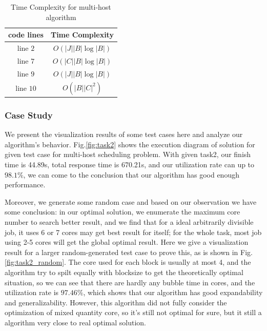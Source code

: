 \documentclass{llncs}
\begin{document}
\begin{table}[t]
\caption{Time Complexity for multi-host algorithm}
\begin{center}
\begin{tabular}{c|c}
\toprule
\textbf{code lines} &\textbf{Time Complexity}  \\
\midrule
line $2$ & $O(|J| |B|\log |B|)$  \\
line $7$ & $O(|C| |B| \log |B| )$  \\
line $9$ & $O(|J| |B| \log |B|)$  \\
line $10$ & $O(|B| |C|^2)$\\
\bottomrule
\end{tabular}
\label{tab-multihost-complexity}
\end{center}
\end{table}


\subsubsection*{Case Study}

We present the visualization results of some test cases here and analyze our algorithm's behavior. Fig.\ref{fig:task2} shows the execution diagram of solution for given test case for multi-host scheduling problem. With given task2, our finish time is 44.89s, total response time is 670.21s, and our utilization rate can up to $98.1\%$, we can come to the conclusion that our algorithm has good enough performance.

Moreover, we generate some random case and based on our observation we have some conclusion: in our optimal solution, we enumerate the maximum core number to search better result, and we find that for a ideal arbitrarily divisible job, it uses 6 or 7 cores may get best result for itself; for the whole task, most job using 2-5 cores will get the global optimal result. Here we give a visualization result for a larger random-generated test case to prove this, as is shown in Fig.\ref{fig:task2_random}. The core used for each block is usually at most 4, and the algorithm try to spilt equally with blocksize to get the theoretically optimal situation, so we can see that there are hardly any bubble time in cores, and the utilization rate is $97.46 \%$, which shows that our algorithm has good expandability and generalizability. However, this algorithm did not fully consider the optimization of mixed quantity core, so it's still not optimal for sure, but it still a algorithm very close to real optimal solution.
\end{document}
